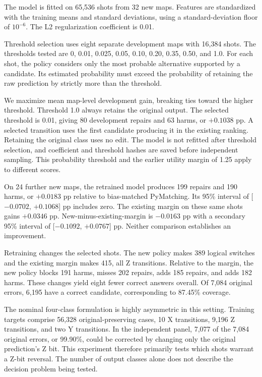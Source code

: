 \documentclass[aps,prd,12pt,twocolumn,superscriptaddress,floatfix]{revtex4-2}
\begin{document}
The model is fitted on 65,536 shots from 32 new maps. Features are standardized with the training means and standard deviations, using a standard-deviation floor of \(10^{-6}\). The L2 regularization coefficient is 0.01.

Threshold selection uses eight separate development maps with 16,384 shots. The thresholds tested are 0, 0.01, 0.025, 0.05, 0.10, 0.20, 0.35, 0.50, and 1.0. For each shot, the policy considers only the most probable alternative supported by a candidate. Its estimated probability must exceed the probability of retaining the raw prediction by strictly more than the threshold.

We maximize mean map-level development gain, breaking ties toward the higher threshold. Threshold 1.0 always retains the original output. The selected threshold is 0.01, giving 80 development repairs and 63 harms, or \(+0.1038\) pp. A selected transition uses the first candidate producing it in the existing ranking. Retaining the original class uses no edit. The model is not refitted after threshold selection, and coefficient and threshold hashes are saved before independent sampling. This probability threshold and the earlier utility margin of 1.25 apply to different scores.

On 24 further new maps, the retrained model produces 199 repairs and 190 harms, or \(+0.0183\) pp relative to bias-matched PyMatching. Its 95\% interval of [\(-0.0702\), \(+0.1068\)] pp includes zero. The existing margin on these same shots gains \(+0.0346\) pp. New-minus-existing-margin is \(-0.0163\) pp with a secondary 95\% interval of [\(-0.1092\), \(+0.0767\)] pp. Neither comparison establishes an improvement.

Retraining changes the selected shots. The new policy makes 389 logical switches and the existing margin makes 415, all Z transitions. Relative to the margin, the new policy blocks 191 harms, misses 202 repairs, adds 185 repairs, and adds 182 harms. These changes yield eight fewer correct answers overall. Of 7,084 original errors, 6,195 have a correct candidate, corresponding to 87.45\% coverage.

The nominal four-class formulation is highly asymmetric in this setting. Training targets comprise 56,328 original-preserving cases, 10 X transitions, 9,196 Z transitions, and two Y transitions. In the independent panel, 7,077 of the 7,084 original errors, or 99.90\%, could be corrected by changing only the original prediction's Z bit. This experiment therefore primarily tests which shots warrant a Z-bit reversal. The number of output classes alone does not describe the decision problem being tested.
\end{document}
